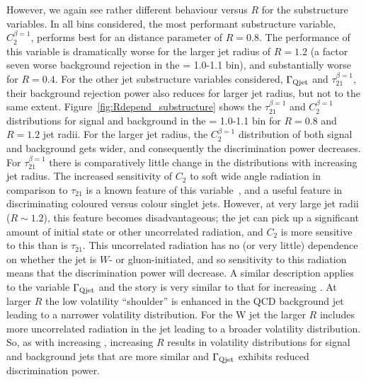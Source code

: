 However, we again see rather
different behaviour versus $R$ for the substructure variables. In all \pt bins
considered, the most performant substructure variable, $C_2^{\beta=1}$,
performs best for an \antikt distance parameter of $R=0.8$. The
performance of this variable is dramatically worse for the larger jet
radius of $R=1.2$ (a factor seven worse background rejection in
the \pt = 1.0-1.1 \TeV bin), and substantially worse for $R=0.4$. For the other
jet substructure variables considered, $\Gamma_{\rm Qjet}$ and
$\tau_{21}^{\beta=1}$, their background rejection
power also reduces for larger jet radius, but not to the same
extent. Figure~\ref{fig:Rdepend_substructure} shows the
$\tau_{21}^{\beta=1}$ and $C_2^{\beta=1}$ distributions for signal and
background in the \pt = 1.0-1.1 \TeV bin for $R=0.8$ and $R=1.2$ jet
radii. For the larger jet radius, the
$C_2^{\beta=1}$  distribution of both signal and background gets wider,
and consequently the discrimination power decreases. For
$\tau_{21}^{\beta=1}$ there is comparatively little change in the distributions
with increasing jet radius. The increased sensitivity of $C_{2}$ to
soft wide angle radiation in comparison to $\tau_{21}$ is a known
feature of this variable~\cite{Larkoski:2013eya}, and a useful feature
in discriminating coloured versus colour singlet jets. However, at
very large jet radii ($R\sim1.2$), this feature becomes
disadvantageous; the jet can pick up a significant amount of initial
state or other uncorrelated radiation, and $C_{2}$ is more sensitive
to this than is $\tau_{21}$.  This uncorrelated radiation has no (or
very little) dependence on whether the jet is $W$- or gluon-initiated, and so sensitivity to this radiation means that the 
discrimination power will decrease. A similar description applies to the 
variable $\Gamma_{\rm Qjet}$ and the story is very similar to that for
increasing \pt.  At larger $R$ the low volatility ``shoulder'' is enhanced in the
QCD background jet leading to a narrower volatility distribution.  For the W jet
the larger $R$ includes more uncorrelated radiation in the jet leading to a broader
volatility distribution.  So, as with increasing \pt, increasing $R$ results in volatility distributions
for signal and background jets that are more similar and $\Gamma_{\rm Qjet}$ exhibits
reduced discrimination power.


